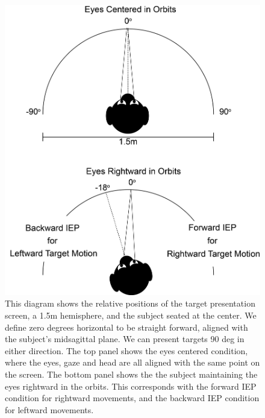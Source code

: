 \documentclass[12pt]{article}
\begin{document}
\begin{figure}[h]
\centering
\includegraphics[width=0.7\linewidth]{./figs/IEPMethodsFigure}
\caption[Diagram of target presentation and initial eye position]{This diagram shows the relative positions of the target presentation screen, a 1.5m hemisphere, and the subject seated at the center. We define zero degrees horizontal to be straight forward, aligned with the subject's midsagittal plane. We can present targets 90 deg in either direction. The top panel shows the eyes centered condition, where the eyes, gaze and head are all aligned with the same point on the screen. The bottom panel shows the the subject maintaining the eyes rightward in the orbits. This corresponds with the forward IEP condition for rightward movements, and the backward IEP condition for leftward movements.}
\label{fig:IEPMethodsFigure}
\end{figure}
\end{document}
